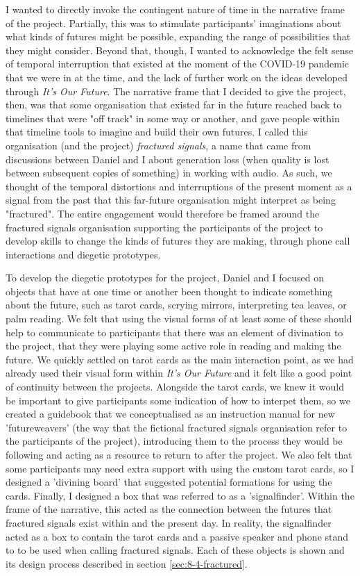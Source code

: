 I wanted to directly invoke the contingent nature of time in the narrative frame of the project. Partially, this was to stimulate participants' imaginations about what kinds of futures might be possible, expanding the range of possibilities that they might consider. Beyond that, though, I wanted to acknowledge the felt sense of temporal interruption that existed at the moment of the COVID-19 pandemic that we were in at the time, and the lack of further work on the ideas developed through \emph{It's Our Future}. The narrative frame that I decided to give the project, then, was that some organisation that existed far in the future reached back to timelines that were "off track" in some way or another, and gave people within that timeline tools to imagine and build their own futures. I called this organisation (and the project) \emph{fractured signals}, a name that came from discussions between Daniel and I about generation loss (when quality is lost between subsequent copies of something) in working with audio. As such, we thought of the temporal distortions and interruptions of the present moment as a signal from the past that this far-future organisation might interpret as being "fractured". The entire engagement would therefore be framed around the fractured signals organisation supporting the participants of the project to develop skills to change the kinds of futures they are making, through phone call interactions and diegetic prototypes.    

To develop the diegetic prototypes for the project, Daniel and I focused on objects that have at one time or another been thought to indicate something about the future, such as tarot cards, scrying mirrors, interpreting tea leaves, or palm reading. We felt that using the visual forms of at least some of these should help to communicate to participants that there was an element of divination to the project, that they were playing some active role in reading and making the future. We quickly settled on tarot cards as the main interaction point, as we had already used their visual form within \emph{It's Our Future} and it felt like a good point of continuity between the projects. Alongside the tarot cards, we knew it would be important to give participants some indication of how to interpet them, so we created a guidebook that we conceptualised as an instruction manual for new 'futureweavers' (the way that the fictional fractured signals organisation refer to the participants of the project), introducing them to the process they would be following and acting as a resource to return to after the project. We also felt that some participants may need extra support with using the custom tarot cards, so I designed a 'divining board' that suggested potential formations for using the cards. Finally, I designed a box that was referred to as a 'signalfinder'. Within the frame of the narrative, this acted as the connection between the futures that fractured signals exist within and the present day. In reality, the signalfinder acted as a box to contain the tarot cards and a passive speaker and phone stand to to be used when calling fractured signals. Each of these objects is shown and its design process described  in section \ref{sec:8-4-fractured}.

